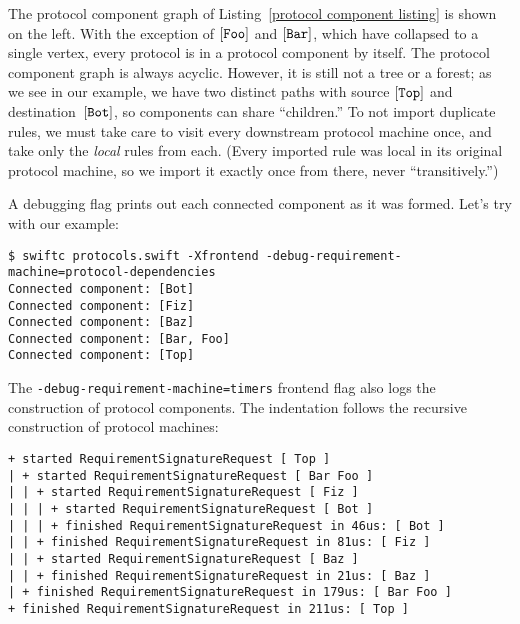 \documentclass[../generics]{subfiles}
\begin{document}
\begin{wrapfigure}{l}{3.5cm}
\end{wrapfigure}

The protocol component graph of Listing~\ref{protocol component listing} is shown on the left. With the exception of $[\texttt{Foo}]$ and $[\texttt{Bar}]$, which have collapsed to a single vertex, every protocol is in a protocol component by itself. The protocol component graph is always acyclic. However, it is still not a tree or a forest; as we see in our example, we have two distinct paths with source $[\texttt{Top}]$ and destination~$[\texttt{Bot}]$, so components can share ``children.'' To not import duplicate rules, we must take care to visit every downstream protocol machine once, and take only the \emph{local} rules from each. (Every imported rule was local in its original protocol machine, so we import it exactly once from there, never ``transitively.'')

A debugging flag prints out each connected component as it was formed. Let's try with our example:
\begin{Verbatim}[fontsize=\footnotesize,numbers=none]
$ swiftc protocols.swift -Xfrontend -debug-requirement-machine=protocol-dependencies
Connected component: [Bot]
Connected component: [Fiz]
Connected component: [Baz]
Connected component: [Bar, Foo]
Connected component: [Top]
\end{Verbatim}

The
\texttt{-debug-requirement-machine=timers} frontend flag also logs the construction of protocol components. The indentation follows the recursive construction of protocol machines:
\begin{Verbatim}[fontsize=\footnotesize,numbers=none]
+ started RequirementSignatureRequest [ Top ]
| + started RequirementSignatureRequest [ Bar Foo ]
| | + started RequirementSignatureRequest [ Fiz ]
| | | + started RequirementSignatureRequest [ Bot ]
| | | + finished RequirementSignatureRequest in 46us: [ Bot ]
| | + finished RequirementSignatureRequest in 81us: [ Fiz ]
| | + started RequirementSignatureRequest [ Baz ]
| | + finished RequirementSignatureRequest in 21us: [ Baz ]
| + finished RequirementSignatureRequest in 179us: [ Bar Foo ]
+ finished RequirementSignatureRequest in 211us: [ Top ]
\end{Verbatim}
\end{document}
